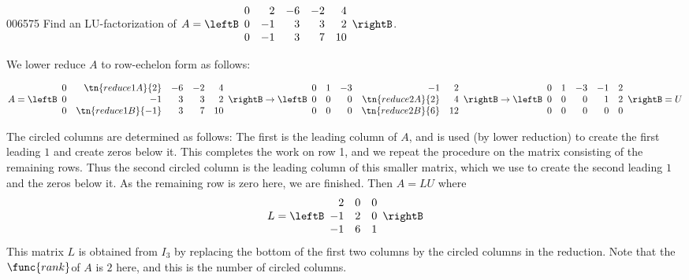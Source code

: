 \begin{example}{}{006575}
Find an LU-factorization of $A = \leftB \begin{array}{rrrrr}
0 & 2 & -6 & -2 & 4 \\
0 & -1 & 3 & 3 & 2 \\
0 & -1 & 3 & 7 & 10
\end{array} \rightB$.

\newpage

\begin{solution}
  We lower reduce $A$ to row-echelon form as follows:
\begin{table}[H]
\begin{equation*}
A = \leftB \begin{array}{rrrrr}
0 & \tn{reduce1A}{2} & -6 & -2 & 4 \\
0 & -1 & 3 & 3 & 2 \\
0 & \tn{reduce1B}{-1} & 3 & 7 & 10
\end{array} \rightB \rightarrow
\leftB \begin{array}{rrrrr}
0 & 1 & -3 & -1 & 2 \\
0 & 0 & 0 & \tn{reduce2A}{2} & 4 \\
0 & 0 & 0 & \tn{reduce2B}{6} & 12
\end{array} \rightB \rightarrow
\leftB \begin{array}{rrrrr}
0 & 1 & -3 & -1 & 2 \\
0 & 0 & 0 & 1 & 2 \\
0 & 0 & 0 & 0 & 0
\end{array} \rightB = U
\end{equation*}
\end{table}
The circled columns are determined as follows: The first is the leading column of $A$, and is used (by lower reduction) to create the first leading $1$ and create zeros below it. This completes the work on row 1, and we repeat the procedure on the matrix consisting of the remaining rows. Thus the second circled column is the leading column of this smaller matrix, which we use to create the second leading $1$ and the zeros below it. As the remaining row is zero here, we are finished. Then $A = LU$ where
\begin{equation*}
L = \leftB \begin{array}{rrr}
2 & 0 & 0 \\
-1 & 2 & 0 \\
-1 & 6 & 1
\end{array} \rightB
\end{equation*}
This matrix $L$ is obtained from $I_{3}$ by replacing the bottom of the first two columns by the circled columns in the reduction. Note that the $\func{rank }$of $A$ is $2$ here, and this is the number of circled columns.
\end{solution}
\end{example}

